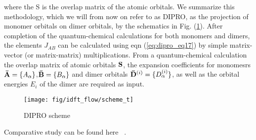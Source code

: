 where the S is the overlap matrix of the atomic orbitals.
We summarize this methodology, which we will from now
on refer to as DIPRO, as the projection of monomer orbitals
on dimer orbitals, by the schematics in Fig. (\ref{fig:scheme}). 
After completion 
of the quantum-chemical calculations for both monomers
and dimers, the elements $J_{AB}$ can be calculated using eqn  
(\ref{eq:dipro_eq17})
by simple matrix-vector (or matrix-matrix) 
multiplications. From a quantum-chemical calculation the overlap
matrix of atomic orbitals $\mathbf{ S }$, the expansion coefficients for
monomesrs $\mathbf{ \bar{A} } = \{ A_{\alpha} \}$,$\mathbf{ \bar{B} } = \{ B_{\alpha} \}$ 
 and dimer orbitals $\mathbf{ \bar{D} }^{(i)} = \{ D^{(i)}_{\alpha} \}$, 
 as well as the orbital
energies $E_{i}$ of the dimer are required as input.

\begin{figure}[h]
    \center
    \texttt{[image: fig/idft\_flow/scheme\_t]}
    \caption{DIPRO scheme}
    \label{fig:scheme}
\end{figure}

Comparative study can be found here
~\cite{baumeier_density-functional_2010}.

